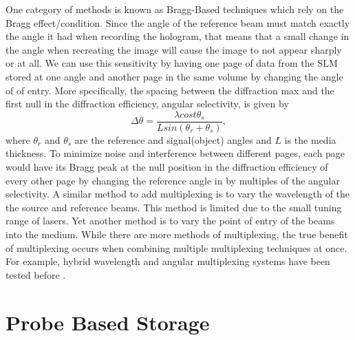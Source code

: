\documentclass[ notitlepage, numerical, 11pt]{revtex4-1} %
\begin{document}
One category of methods is known as Bragg-Based techniques which rely on the Bragg effect/condition. Since the angle of the reference beam must match exactly the angle it had when recording the hologram, that means that a small change in the angle when recreating the image will cause the image to not appear sharply or at all. We can use this sensitivity by having one page of data from the SLM stored at one angle and another page in the same volume by changing the angle of of entry. More specifically, the spacing between the diffraction max and the first null in the diffraction efficiency, angular selectivity, is given by
\begin{equation}
\Delta \theta = \frac{\lambda cost\theta_s}{Lsin(\theta_r + \theta_s)},
\label{angular}
\end{equation}
where $\theta_r$ and $\theta_s$ are the reference and signal(object) angles and $L$ is the media thickness. To minimize noise and interference between different pages, each page would have its Bragg peak at the null position in the diffraction efficiency of every other page by changing the reference angle in by multiples of the angular selectivity. A similar method to add multiplexing is to vary the wavelength of the the source and reference beams. This method is limited due to the small tuning range of lasers. Yet another method is to vary the point of entry of the beams into the medium. While there are more methods of multiplexing, the true benefit of multiplexing occurs when combining multiple multiplexing techniques at once. For example, hybrid wavelength and angular multiplexing systems have been tested before \cite{memory}. 



\section{Probe Based Storage}
\end{document}
